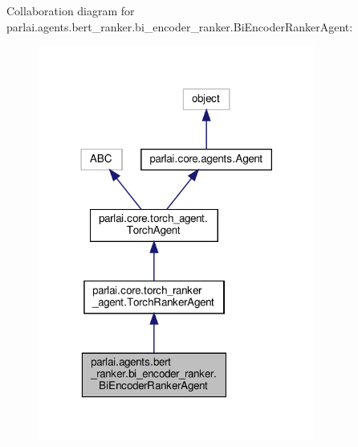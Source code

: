Collaboration diagram for parlai.\+agents.\+bert\+\_\+ranker.\+bi\+\_\+encoder\+\_\+ranker.\+Bi\+Encoder\+Ranker\+Agent\+:
\nopagebreak
\begin{figure}[H]
\begin{center}
\leavevmode
\includegraphics[width=258pt]{d3/d5a/classparlai_1_1agents_1_1bert__ranker_1_1bi__encoder__ranker_1_1BiEncoderRankerAgent__coll__graph}
\end{center}
\end{figure}
